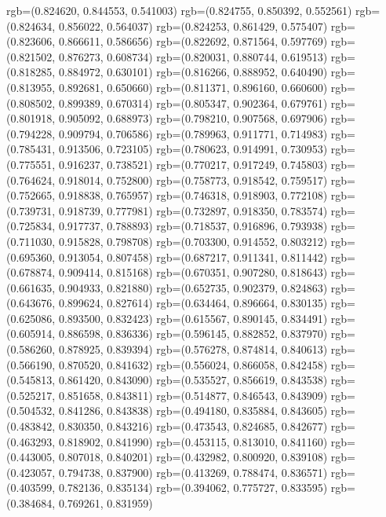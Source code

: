 {{{					rgb=(0.824620, 0.844553, 0.541003)
					rgb=(0.824755, 0.850392, 0.552561)
					rgb=(0.824634, 0.856022, 0.564037)
					rgb=(0.824253, 0.861429, 0.575407)
					rgb=(0.823606, 0.866611, 0.586656)
					rgb=(0.822692, 0.871564, 0.597769)
					rgb=(0.821502, 0.876273, 0.608734)
					rgb=(0.820031, 0.880744, 0.619513)
					rgb=(0.818285, 0.884972, 0.630101)
					rgb=(0.816266, 0.888952, 0.640490)
					rgb=(0.813955, 0.892681, 0.650660)
					rgb=(0.811371, 0.896160, 0.660600)
					rgb=(0.808502, 0.899389, 0.670314)
					rgb=(0.805347, 0.902364, 0.679761)
					rgb=(0.801918, 0.905092, 0.688973)
					rgb=(0.798210, 0.907568, 0.697906)
					rgb=(0.794228, 0.909794, 0.706586)
					rgb=(0.789963, 0.911771, 0.714983)
					rgb=(0.785431, 0.913506, 0.723105)
					rgb=(0.780623, 0.914991, 0.730953)
					rgb=(0.775551, 0.916237, 0.738521)
					rgb=(0.770217, 0.917249, 0.745803)
					rgb=(0.764624, 0.918014, 0.752800)
					rgb=(0.758773, 0.918542, 0.759517)
					rgb=(0.752665, 0.918838, 0.765957)
					rgb=(0.746318, 0.918903, 0.772108)
					rgb=(0.739731, 0.918739, 0.777981)
					rgb=(0.732897, 0.918350, 0.783574)
					rgb=(0.725834, 0.917737, 0.788893)
					rgb=(0.718537, 0.916896, 0.793938)
					rgb=(0.711030, 0.915828, 0.798708)
					rgb=(0.703300, 0.914552, 0.803212)
					rgb=(0.695360, 0.913054, 0.807458)
					rgb=(0.687217, 0.911341, 0.811442)
					rgb=(0.678874, 0.909414, 0.815168)
					rgb=(0.670351, 0.907280, 0.818643)
					rgb=(0.661635, 0.904933, 0.821880)
					rgb=(0.652735, 0.902379, 0.824863)
					rgb=(0.643676, 0.899624, 0.827614)
					rgb=(0.634464, 0.896664, 0.830135)
					rgb=(0.625086, 0.893500, 0.832423)
					rgb=(0.615567, 0.890145, 0.834491)
					rgb=(0.605914, 0.886598, 0.836336)
					rgb=(0.596145, 0.882852, 0.837970)
					rgb=(0.586260, 0.878925, 0.839394)
					rgb=(0.576278, 0.874814, 0.840613)
					rgb=(0.566190, 0.870520, 0.841632)
					rgb=(0.556024, 0.866058, 0.842458)
					rgb=(0.545813, 0.861420, 0.843090)
					rgb=(0.535527, 0.856619, 0.843538)
					rgb=(0.525217, 0.851658, 0.843811)
					rgb=(0.514877, 0.846543, 0.843909)
					rgb=(0.504532, 0.841286, 0.843838)
					rgb=(0.494180, 0.835884, 0.843605)
					rgb=(0.483842, 0.830350, 0.843216)
					rgb=(0.473543, 0.824685, 0.842677)
					rgb=(0.463293, 0.818902, 0.841990)
					rgb=(0.453115, 0.813010, 0.841160)
					rgb=(0.443005, 0.807018, 0.840201)
					rgb=(0.432982, 0.800920, 0.839108)
					rgb=(0.423057, 0.794738, 0.837900)
					rgb=(0.413269, 0.788474, 0.836571)
					rgb=(0.403599, 0.782136, 0.835134)
					rgb=(0.394062, 0.775727, 0.833595)
					rgb=(0.384684, 0.769261, 0.831959)
}}}
